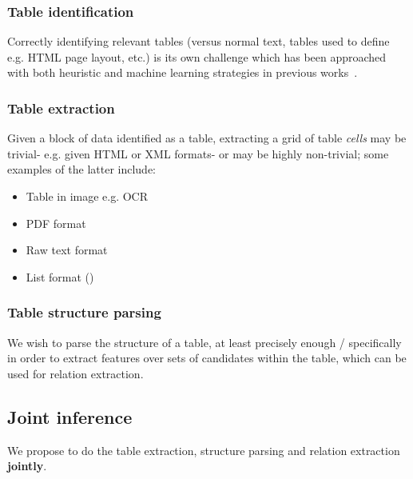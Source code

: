 \documentclass[11pt]{article} %
\begin{document}
\subsubsection{Table identification}
Correctly identifying relevant tables (versus normal text, tables used to define e.g. HTML page layout, etc.) is its own challenge which has been approached with both heuristic and machine learning strategies in previous works~\cite{?}.

\subsubsection{Table extraction}
Given a block of data identified as a table, extracting a grid of table \textit{cells} may be trivial- e.g. given HTML or XML formats- or may be highly non-trivial; some examples of the latter include:
\begin{itemize}
  \item Table in image e.g. OCR
  \item PDF format
  \item Raw text format
  \item List format (\cite{Ganjam_2015})
\end{itemize}

\subsubsection{Table structure parsing}
We wish to parse the structure of a table, at least precisely enough / specifically in order to extract features over sets of candidates within the table, which can be used for relation extraction. 

\subsection{Joint inference}
We propose to do the table extraction, structure parsing and relation extraction \textbf{jointly}.
\end{document}
